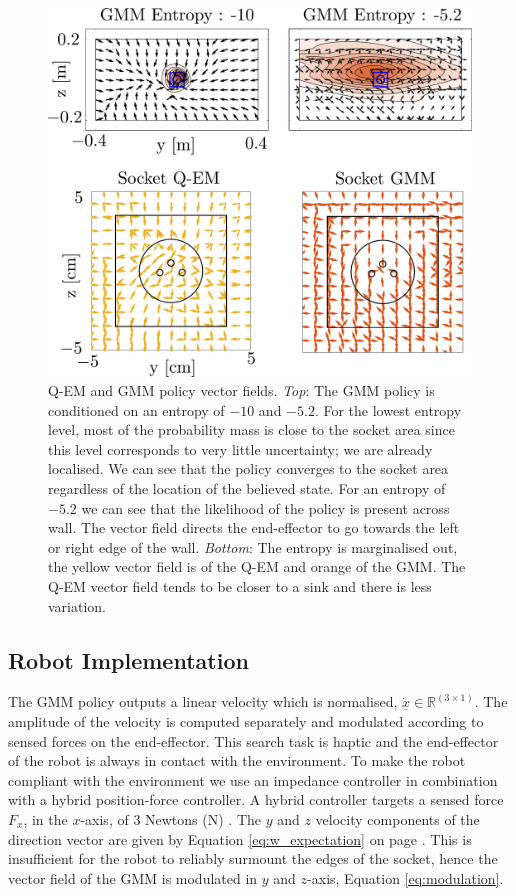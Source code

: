 \begin{figure}
   \includegraphics[width=\textwidth]{./ch4-PiH/Figures/Fig/policy_vf.pdf}
  \caption{Q-EM and GMM policy vector fields. \textit{Top}: The GMM policy is conditioned on an entropy of $-10$ and $-5.2$. For the lowest entropy level,
  most of the probability mass is close to the socket area since this level corresponds to very little uncertainty; we are already localised. We can see 
  that the policy converges to the socket area regardless of the location of the believed state. For an entropy of $-5.2$ we can see that 
  the likelihood of the policy is present across wall. The vector field directs the end-effector to go towards the left or right edge of the wall. 
  \textit{Bottom}: The entropy is marginalised out, the yellow vector field is of the Q-EM and orange of the GMM. The Q-EM vector field tends 
  to be closer to a sink and there is less variation.}
  \label{fig:policy_vf}
\end{figure}


\subsection{Robot Implementation}

The GMM policy outputs a linear velocity which is normalised, $\underline{\dot{x}} \in \mathbb{R}^{(3 \times 1)}$. 
The amplitude of the velocity is computed separately and modulated according to sensed forces on the end-effector.
This search task is haptic and the end-effector of the robot is always in contact with the environment. To make the robot
compliant with the environment we use an impedance controller in combination with a hybrid position-force controller. A hybrid controller
targets a sensed force $F_x$, in the $x$-axis, of 3 Newtons (N) . The $y$ and $z$ velocity components of the direction vector are given by 
Equation \ref{eq:w_expectation} on page \pageref{eq:w_expectation}. This is insufficient for the robot to reliably surmount the edges of the socket,
hence the vector field of the GMM is modulated in $y$ and $z$-axis, Equation \ref{eq:modulation}.

